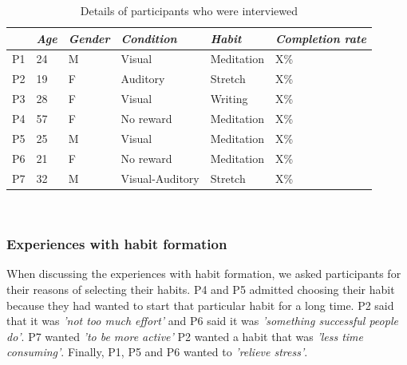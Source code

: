 \documentclass{scaffold/sigchi}
\begin{document}

\begin{table}[b]
  \begin{tabular}{l l l l l p{1cm}}
    \multicolumn{1}{l}{\small \textit{~}} &
    \multicolumn{1}{l}{\small \textit{Age}} & 
    \multicolumn{1}{l}{\small \textit{Gender}} & 
    \multicolumn{1}{l}{\small \textit{Condition}} &
    \multicolumn{1}{l}{\small \textit{Habit}} &
    \multicolumn{1}{l}{\small \textit{Completion rate}} \\
    \midrule
    P1 & 24 & M & Visual & Meditation & X\% \\
    P2 & 19 & F & Auditory & Stretch & X\% \\ 
    P3 & 28 & F & Visual & Writing & X\% \\
    P4 & 57 & F & No reward & Meditation & X\% \\ 
    P5 & 25 & M & Visual & Meditation & X\% \\ 
    P6 & 21 & F & No reward & Meditation & X\% \\ 
    P7 & 32 & M & Visual-Auditory & Stretch & X\% \\
  \end{tabular}
  \caption{Details of participants who were interviewed}~\label{table:transcript_participant_breakdown}
\end{table}


 
\subsubsection{Experiences with habit formation}
When discussing the experiences with habit formation, we asked participants for their reasons of selecting their habits. P4 and P5 admitted choosing their habit because they had wanted to start that particular habit for a long time. P2 said that it was \textit{'not too much effort'} and P6 said it was \textit{'something successful people do'}. P7 wanted \textit{'to be more active'} P2 wanted a habit that was \textit{'less time consuming'}. Finally, P1, P5 and P6 wanted to \textit{'relieve stress'}. 
\end{document}
